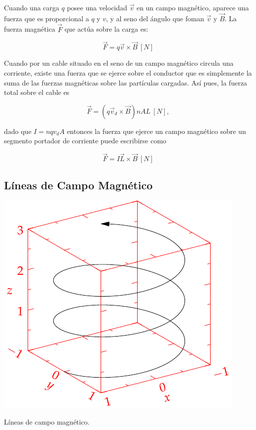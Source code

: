 \documentclass{tufte-handout}
\begin{document}
Cuando una carga $q$ posee una velocidad $\vec{v}$ en un campo magnético, aparece una fuerza que es proporcional a $q$ y $v$, y al seno del ángulo que foman $\vec{v}$ y $\vec{B}$. La fuerza magnética $\vec{F}$ que actúa sobre la carga es:

\begin{equation}
\vec{F} = q\vec{v}\times\vec{B}~[N]
\end{equation}

Cuando por un cable situado en el seno de un campo magnético circula una corriente, existe una fuerza que se ejerce sobre el conductor que es simplemente la suma de las fuerzas magnéticas sobre las partículas cargadas. Así pues, la fuerza total sobre el cable es

\begin{equation}
\vec{F} = (q\vec{v}_d\times\vec{B})nAL~[N],
\end{equation}

dado que $I = nqv_dA$ entonces la fuerza que ejerce un campo magnético sobre un segmento portador de corriente puede escribirse como

\begin{equation}
\vec{F} = I\vec{L}\times\vec{B}~[N]
\end{equation}

\subsection{Líneas de Campo Magnético}

\begin{marginfigure}%
    \includegraphics[width=\linewidth]{helix}
    \caption{Líneas de campo magnético.}
    \label{fig:lineascampomagnetico}
\end{marginfigure}
\end{document}
